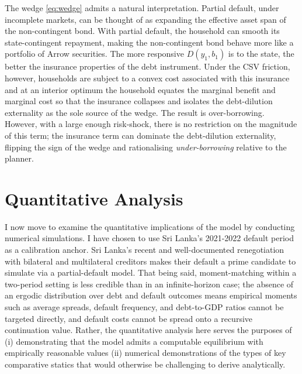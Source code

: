 \documentclass[11pt]{article}
\theoremstyle{definition}
\theoremstyle{plain}
\theoremstyle{remark}
\begin{document}
The wedge \eqref{eq:wedge} admits a natural interpretation. Partial default, under incomplete markets, can be thought of as expanding the effective asset span of the non-contingent bond. With partial default, the household can smooth its state-contingent repayment, making the non-contingent bond behave more like a portfolio of Arrow securities. The more responsive $D(y_1,b_1)$ is to the state, the better the insurance properties of the debt instrument. Under the CSV friction, however, households are subject to a convex cost associated with this insurance and at an interior optimum the household equates the marginal benefit and marginal cost so that the insurance collapses and isolates the debt-dilution externality as the sole source of the wedge. The result is over-borrowing. However, with a large enough risk-shock, there is no restriction on the magnitude of this term; the insurance term can dominate the debt-dilution externality, flipping the sign of the wedge and rationalising \textit{under-borrowing} relative to the planner.

\section{Quantitative Analysis} \label{sec:quantitative}


I now move to examine the quantitative implications of the model by conducting numerical simulations. I have chosen to use Sri Lanka's 2021-2022 default period as a calibration anchor. Sri Lanka's recent and well-documented renegotiation with bilateral and multilateral creditors makes their default a prime candidate to simulate via a partial-default model. That being said, moment-matching within a two-period setting is less credible than in an infinite-horizon case; the absence of an ergodic distribution over debt and default outcomes means empirical moments such as average spreads, default frequency, and debt-to-GDP ratios cannot be targeted directly, and default costs cannot be spread onto a recursive continuation value. Rather, the quantitative analysis here serves the purposes of (i) demonstrating that the model admits a computable equilibrium with empirically reasonable values (ii) numerical demonstrations of the types of key comparative statics that would otherwise be challenging to derive analytically.
\end{document}
